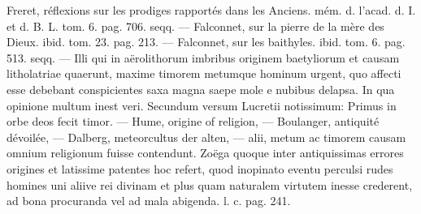\documentclass[a4paper, 11pt, oneside, polutonikogreek, german]{article}
\begin{document}
Freret, réflexions sur les prodiges rapportés dans les Anciens. mém. d. l'acad. d. I. et d. B. L. tom. 6. pag. 706. seqq. --- Falconnet, sur la pierre de la mère des Dieux. ibid. tom. 23. pag. 213. --- Falconnet, sur les baithyles. ibid. tom. 6. pag. 513. seqq. --- Illi qui in aërolithorum imbribus originem baetyliorum et causam litholatriae quaerunt, maxime timorem metumque hominum urgent, quo affecti esse debebant conspicientes saxa magna saepe mole e nubibus delapsa. In qua opinione multum inest veri. Secundum versum Lucretii notissimum: Primus in orbe deos fecit timor. --- Hume, origine of religion, --- Boulanger, antiquité dévoilée, --- Dalberg, meteorcultus der alten, --- alii, metum ac timorem causam omnium religionum fuisse contendunt. Zoëga quoque inter antiquissimas errores origines et latissime patentes hoc refert, quod inopinato eventu perculsi rudes homines uni aliive rei divinam et plus quam naturalem virtutem inesse crederent, ad bona procuranda vel ad mala abigenda. l. c. pag. 241.
\end{document}
